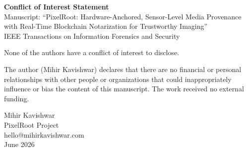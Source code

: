 \documentclass[11pt]{article}
\begin{document}
\begin{center}
{\large\bfseries Conflict of Interest Statement}\\[0.4em]
{Manuscript: ``PixelRoot: Hardware-Anchored, Sensor-Level Media Provenance with
Real-Time Blockchain Notarization for Trustworthy Imaging''}\\[0.2em]
{IEEE Transactions on Information Forensics and Security}
\end{center}

\vspace{1em}

\noindent None of the authors have a conflict of interest to disclose.

\vspace{0.8em}

\noindent The author (Mihir Kavishwar) declares that there are no financial or
personal relationships with other people or organizations that could
inappropriately influence or bias the content of this manuscript. The work
received no external funding.

\vspace{2em}

\noindent Mihir Kavishwar\\
PixelRoot Project\\
hello@mihirkavishwar.com\\
June 2026
\end{document}

